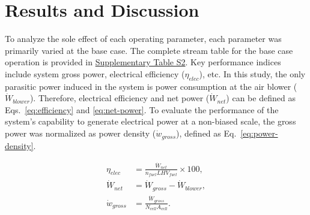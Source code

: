 \documentclass[a4paper,10pt]{cas-dc} %
\begin{document}
\FloatBarrier

\section{Results and Discussion}

To analyze the sole effect of each operating parameter, each parameter was primarily varied at the base case.
The complete stream table for the base case operation is provided in \href{Supplementary.pdf}{Supplementary Table S2}.
Key performance indices include system gross power, electrical efficiency ($\eta_{elec}$), etc.
In this study, the only parasitic power induced in the system is power consumption at the air blower ($\dot{W}_{blower}$).
Therefore, electrical efficiency and net power ($\dot{W}_{net}$) can be defined as Eqs.~\eqref{eq:efficiency} and \eqref{eq:net-power}.
To evaluate the performance of the system's capability to generate electrical power at a non-biased scale, the gross power was normalized as power density ($\dot{w}_{gross}$), defined as Eq.~\eqref{eq:power-density}.

\begin{align}
\eta_{elec} &= \frac{\dot{W}_{net}}{\dot{n}_{fuel} LHV_{fuel}} \times 100, \label{eq:efficiency} \\
\dot{W}_{net} &= \dot{W}_{gross} - \dot{W}_{blower}, \label{eq:net-power} \\
\dot{w}_{gross} &= \frac{\dot{W}_{gross}}{N_{cell} A_{cell}}. \label{eq:power-density}
\end{align}
\end{document}
